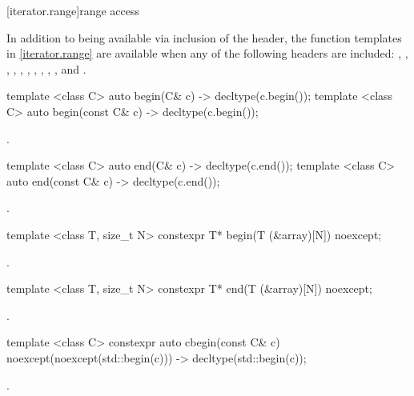 [iterator.range]{range access}

\pnum
In addition to being available via inclusion of the  header,
the function templates in \ref{iterator.range} are available when any of the following
headers are included: , , ,
, , , , ,
, , and .

%
\begin{itemdecl}
template <class C> auto begin(C& c) -> decltype(c.begin());
template <class C> auto begin(const C& c) -> decltype(c.begin());
\end{itemdecl}

\begin{itemdescr}
\pnum
\returns {}.
\end{itemdescr}

%
\begin{itemdecl}
template <class C> auto end(C& c) -> decltype(c.end());
template <class C> auto end(const C& c) -> decltype(c.end());
\end{itemdecl}

\begin{itemdescr}
\pnum
\returns {}.
\end{itemdescr}

%
\begin{itemdecl}
template <class T, size_t N> constexpr T* begin(T (&array)[N]) noexcept;
\end{itemdecl}

\begin{itemdescr}
\pnum
\returns {}.
\end{itemdescr}

%
\begin{itemdecl}
template <class T, size_t N> constexpr T* end(T (&array)[N]) noexcept;
\end{itemdecl}

\begin{itemdescr}
\pnum
\returns {}.
\end{itemdescr}

%
\begin{itemdecl}
template <class C> constexpr auto cbegin(const C& c) noexcept(noexcept(std::begin(c)))
  -> decltype(std::begin(c));
\end{itemdecl}
\begin{itemdescr}
\pnum \returns {}.
\end{itemdescr}


